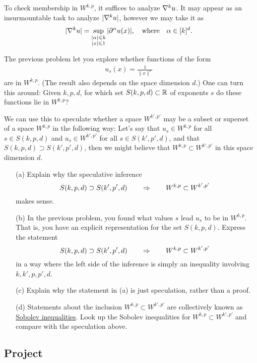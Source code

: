 \documentclass[12pt]{memoir}
\begin{document}
\begin{ptcbr}
To check membership in $W^{k,p}$, it suffices to analyze $\nabla^k u$. It may appear as an insurmountable task to analyze $|\nabla^k u|$, however we may take it as 
$$|\nabla^k u|=\sup_{\substack{|\alpha|\leqslant k\\ |x|\leqslant 1}}|\partial^\alpha u(x)|,\quad\text{where}\quad\alpha\in[k]^d.$$
\end{ptcbr}
\begin{Ej}
    The previous problem let you explore whether functions of the form
  \begin{align*}
    u_s(x) = \frac{1}{\|x\|^s}
  \end{align*}
  are in $W^{k,p}$. (The result also depends on the space dimension
  $d$.) One can turn this around: Given $k,p,d$, for which set
  $S(k,p,d)\subset \mathbb{R}$ of exponents $s$ do these functions lie in $W^{k,p}$?

  We can use this to speculate whether a space $W^{k',p'}$ may be a
  subset or superset of a space $W^{k,p}$ in the following way: Let's
  say that $u_s \in W^{k,p}$ for all $s\in S(k,p,d)$ and 
  $u_s \in W^{k',p'}$ for all $s\in S(k',p',d)$, and that 
  $S(k,p,d) \supset S(k',p',d)$, then we might believe that 
  $W^{k,p} \subset W^{k',p'}$ in this space dimension $d$.

  \begin{itemize}
  \item[(a)] Explain why the speculative inference
  $$
    S(k,p,d) \supset S(k',p',d)
    \qquad\Rightarrow\qquad
    W^{k,p} \subset W^{k',p'}
  $$
  makes sense.

  \item[(b)] In the previous problem, you found what values $s$ lead
    $u_s$ to be in $W^{k,p}$. That is, you have an explicit
    representation for the set $S(k,p,d)$. Express the statement
    $$
    S(k,p,d) \supset S(k',p',d)
    \qquad\Rightarrow\qquad
    W^{k,p} \subset W^{k',p'}
  $$
  in a way where the left side of the inference is simply an
  inequality involving $k,k',p,p',d$.

  \item[(c)] Explain why the statement in (a) is just speculation, rather than a
    proof.

  \item[(d)] Statements about the inclusion $W^{k,p} \subset
    W^{k',p'}$ are collectively known as
    \href{https://en.wikipedia.org/wiki/Sobolev_inequality}{Sobolev
      inequalities}. Look up the Sobolev inequalities for $W^{k,p} \subset
    W^{k',p'}$ and compare with the speculation above. 
  \end{itemize}
\end{Ej}

\subsection*{Project}
\end{document}
